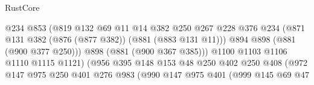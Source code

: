 \begin{lexlean}{RustCore}
\begin{coremodule}
                                          @234
                                          @853
                                          (@819
                                            @132
                                            @69
                                            @11
                                            @14
                                            @382
                                            @250
                                            @267
                                            @228
                                            @376
                                            @234
                                            (@871
                                              @131
                                              @382
                                              (@876 (@877 @382))
                                              (@881 (@883 @131 @11)))
                                            @894
                                            @898
                                            (@881 (@900 @377 @250)))
                                          @898
                                          (@881 (@900 @367 @385)))
                                        @1100
                                        @1103
                                        @1106
                                        @1110
                                        @1115
                                        @1121)
                                      (@956
                                        @395
                                        @148
                                        @153
                                        @48
                                        @250
                                        @402
                                        @250
                                        @408
                                        (@972
                                          @147
                                          @975
                                          @250
                                          @401
                                          @276
                                          @983
                                          (@990
                                            @147
                                            @975
                                            @401
                                            (@999
                                              @145
                                              @69
                                              @47

\end{coremodule}
\end{lexlean}
